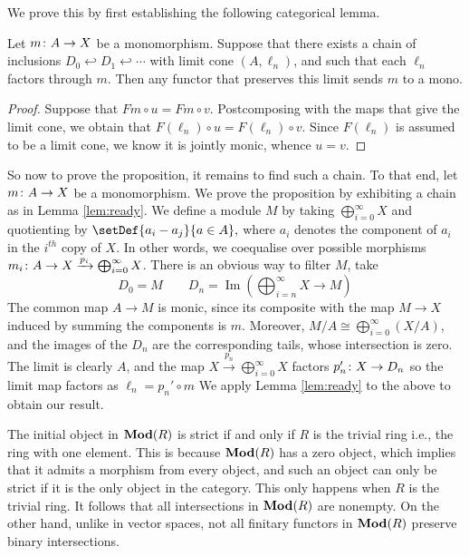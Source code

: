 \documentclass[runningheads]{llncs}
\begin{document}
\begin{proofE}
We prove this by first establishing the following categorical lemma.
\begin{lemma}
\label{lem:ready}
Let  $m \colon A \to X$ be a monomorphism. Suppose that there exists a chain of inclusions $D_0\hookleftarrow D_1 \hookleftarrow \cdots$ with limit cone $(A, \ell_n)$, and such that each $\ell_n$ factors through $m$. Then any functor that preserves this limit sends $m$  to a mono.
\end{lemma}
\begin{proof}
Suppose that $Fm\circ u = Fm \circ v.$ Postcomposing with the maps that give the limit cone, we obtain that $F(\ell_n) \circ u = F(\ell_n) \circ v$. Since $F(\ell_n)$ is assumed to be a limit cone, we know it is jointly monic, whence $u = v.$
\end{proof}
So now to prove the proposition, it remains to find such a chain.
To that end, let  $m \colon A \to X$ be a monomorphism. 
We prove the proposition by exhibiting a chain as in Lemma \ref{lem:ready}. 
We define a module $M$ by taking $\bigoplus_{i=0}^\infty X$ and quotienting by  $\setDef{a_i - a_j}{ a \in A},$ where $a_i$ denotes the component of $a_i$ in the $i^{th}$ copy of $X$. 
In other words, we coequalise over possible morphisms $m_i \colon A \to X \xrightarrow{p_i} \bigoplus_{i=0}^\infty X$.
There is an obvious way to  filter $M$, take 
\begin{equation*}
D_0= M \qquad D_n = \operatorname{Im}\left(\bigoplus_{i=n}^\infty X\longrightarrow M \right)
\end{equation*}
The common map $A \to M$ is monic, since its composite with the map $M \to X$ induced by summing the components is $m$.
Moreover, $M / A \cong \bigoplus_{i=0}^\infty (X / A)$, and the images of the $D_n$ are the corresponding tails, whose intersection is zero.
The limit is clearly $A$, and the map $X \xrightarrow{p_n}  \bigoplus_{i=0}^\infty X$ factors $p_n' \colon X \to D_n$  so the limit map factors as $\ell_n = p_n' \circ m$
We apply Lemma \ref{lem:ready} to the above to obtain our result.
\end{proofE}
\begin{example}
The initial object in $\operatorname{\mathbf{Mod}}(R)$ is strict if and only if $R$ is the trivial ring i.e., the ring with one element. This is because $\operatorname{\mathbf{Mod}}(R)$ has a zero object, which implies that it admits a morphism from every object, and such an object can only be strict if it is the only object in the category. This only happens when $R$ is the trivial ring. It follows that all intersections in $\operatorname{\mathbf{Mod}}(R)$ are nonempty. On the other hand, unlike in vector spaces, not all finitary functors in $\operatorname{\mathbf{Mod}}(R)$ preserve binary intersections.
\end{example}
\end{document}
